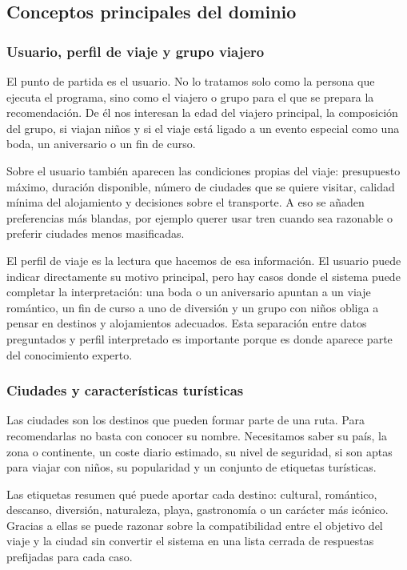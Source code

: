 \documentclass[11pt,a4paper]{article}
\begin{document}
\subsection{Conceptos principales del dominio}
\subsubsection{Usuario, perfil de viaje y grupo viajero}
El punto de partida es el usuario. No lo tratamos solo como la persona
que ejecuta el programa, sino como el viajero o grupo para el que se prepara la
recomendaci\'on. De \'el nos interesan la edad del viajero principal, la
composici\'on del grupo, si viajan ni\~nos y si el viaje est\'a ligado a un evento
especial como una boda, un aniversario o un fin de curso.

Sobre el usuario tambi\'en aparecen las condiciones propias del viaje:
presupuesto m\'aximo, duraci\'on disponible, n\'umero de ciudades que se quiere
visitar, calidad m\'inima del alojamiento y decisiones sobre el transporte. A
eso se a\~naden preferencias m\'as blandas, por ejemplo querer usar tren cuando
sea razonable o preferir ciudades menos masificadas.

El perfil de viaje es la lectura que hacemos de esa informaci\'on. El
usuario puede indicar directamente su motivo principal, pero hay casos donde
el sistema puede completar la interpretaci\'on: una boda o un aniversario
apuntan a un viaje rom\'antico, un fin de curso a uno de diversi\'on y un grupo
con ni\~nos obliga a pensar en destinos y alojamientos adecuados. Esta
separaci\'on entre datos preguntados y perfil interpretado es importante porque
es donde aparece parte del conocimiento experto.

\subsubsection{Ciudades y caracter\'isticas tur\'isticas}
Las ciudades son los destinos que pueden formar parte de una ruta.
Para recomendarlas no basta con conocer su nombre. Necesitamos saber su pa\'is,
la zona o continente, un coste diario estimado, su nivel de seguridad, si son
aptas para viajar con ni\~nos, su popularidad y un conjunto de etiquetas
tur\'isticas.

Las etiquetas resumen qu\'e puede aportar cada destino: cultural, rom\'antico,
descanso, diversi\'on, naturaleza, playa, gastronom\'ia o un car\'acter m\'as
ic\'onico. Gracias a ellas se puede razonar sobre la compatibilidad entre el
objetivo del viaje y la ciudad sin convertir el sistema en una lista cerrada
de respuestas prefijadas para cada caso.
\end{document}
